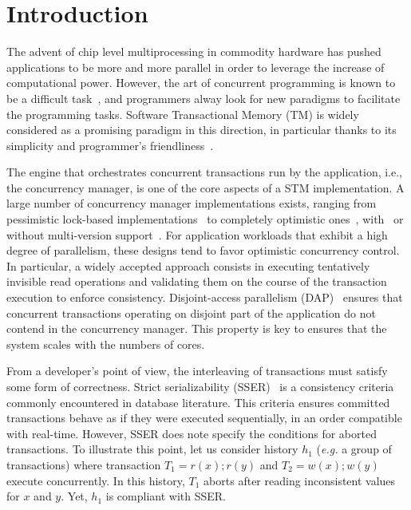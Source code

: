 \section{Introduction}

The advent of chip level multiprocessing in commodity hardware has pushed applications to be more and more parallel in order to leverage the increase of computational power.
However, the art of concurrent programming is known to be a difficult task~\cite{Lee:2006:PT:1137232.1137289}, and programmers alway look for new paradigms to facilitate the programming tasks.
Software Transactional Memory (TM) is widely considered as a promising paradigm in this direction, in particular thanks to its simplicity and programmer's friendliness~\cite{Dragojevic:2011:WSM:1924421.1924440}.

The engine that orchestrates concurrent transactions run by the application, i.e., the concurrency manager, is one of the core aspects of a STM implementation.
A large number of concurrency manager implementations exists, ranging from pessimistic lock-based implementations~\cite{harris2005revocable,afek2012pessimistic} to completely optimistic ones~\cite{hassan2014optimistic}, with~\cite{perelman2011smv} or without multi-version support~\cite{attiya2012single}.
For application workloads that exhibit a high degree of parallelism, these designs tend to favor optimistic concurrency control.
In particular, a widely accepted approach consists in executing tentatively invisible read operations and validating them on the course of the transaction execution to enforce consistency.
Disjoint-access parallelism (DAP)~\cite{ellen2012universal} ensures that concurrent transactions operating on disjoint part of the application do not contend in the concurrency manager.
This property is key to ensures that the system scales with the numbers of cores.

From a developer's point of view, the interleaving of transactions must satisfy some form of correctness.
Strict serializability (SSER)~\cite{herlihy1990linearizability} is a consistency criteria commonly encountered in database literature.
This criteria ensures committed transactions behave as if they were executed sequentially, in an order compatible with real-time.
However, SSER does note specify the conditions for aborted transactions.
To illustrate this point, let us consider history $h_1$ (\emph{e.g.} a group of transactions) where transaction $T_1=r(x);r(y)$ and $T_2=w(x);w(y)$ execute concurrently.
In this history, $T_1$ aborts after reading inconsistent values for $x$ and $y$.
Yet, $h_1$ is compliant with SSER.


